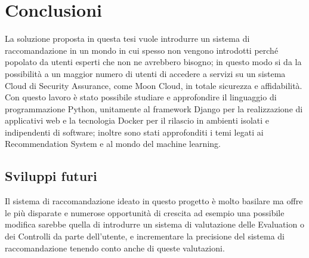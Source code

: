 \chapter{Conclusioni}
\label{chp:05-conclusion}
La soluzione proposta in questa tesi vuole introdurre un sistema di raccomandazione in un mondo in cui spesso non vengono 
introdotti perché popolato da utenti esperti che non ne avrebbero bisogno; in questo modo si da la possibilità a un 
maggior numero di utenti di accedere a servizi su un sistema Cloud di Security Assurance, come 
Moon Cloud, in totale sicurezza e affidabilità.\\
Con questo lavoro è stato possibile studiare e approfondire il linguaggio di programmazione Python, unitamente al framework
Django per la realizzazione di applicativi web e la tecnologia Docker per il rilascio in ambienti isolati e indipendenti 
di software; inoltre sono stati approfonditi i temi legati ai Recommendation System e al mondo del machine learning.

\section{Sviluppi futuri}
Il sistema di raccomandazione ideato in questo progetto è molto basilare ma offre le più disparate e numerose opportunità
di crescita ad esempio una possibile modifica sarebbe quella di introdurre un sistema di valutazione delle Evaluation o 
dei Controlli da parte dell'utente, e incrementare la precisione del sistema di raccomandazione tenendo conto anche di
queste valutazioni.

